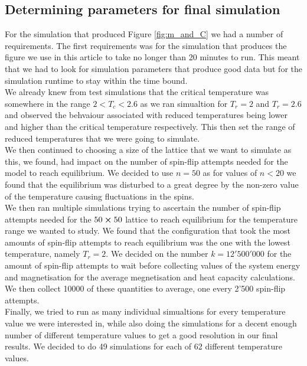 \documentclass[twocolumn,a4paper,aps,amsmath,amssymb,floatfix,superscriptaddress]{revtex4-2}
\begin{document}
        \subsection{Determining parameters for final simulation}
            For the simulation that produced Figure \ref{fig:m_and_C} we had a number of requirements. The first requirements was for the simulation that produces the figure we use in this article to take no longer than 20 minutes to run. This meant that we had to look for simulation parameters that produce good data but for the simulation runtime to stay within the time bound.\\
            We already knew from test simulations that the critical temperature was somewhere in the range $2 < T_c < 2.6$ as we ran simualtion for $T_r = 2$ and $T_r = 2.6$ and observed the behvaiour associated with reduced temperatures being lower and higher than the critical temperature respectively. This then set the range of reduced temperatures that we were going to simulate.\\
            We then continued to choosing a size of the lattice that we want to simulate as this, we found, had impact on the number of spin-flip attempts needed for the model to reach equilibrium. We decided to use $n = 50$ as for values of $n<20$ we found that the equilibrium was disturbed to a great degree by the non-zero value of the temperature causing fluctuations in the spins.\\
            We then ran multiple simulations trying to ascertain the number of spin-flip attempts needed for the $50 \cross 50$ lattice to reach equilibrium for the temperature range we wanted to study. We found that the configuration that took the most amounts of spin-flip attempts to reach equilibrium was the one with the lowest temperature, namely $T_r = 2$. We decided on the number $k = 12'500'000$ for the amount of spin-flip attempts to wait before collecting values of the system energy and magnetisation for the average megnetisation and heat capacity calculations.\\
            We then collect 10000 of these quantities to average, one every 2'500 spin-flip attempts.\\
            Finally, we tried to run as many individual simualtions for every temperature value we were interested in, while also doing the simulations for a decent enough number of different temperature values to get a good resolution in our final results. We decided to do 49 simulations for each of 62 different temperature values.
\end{document}

